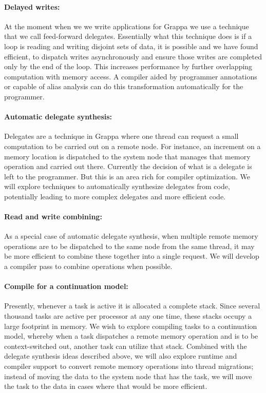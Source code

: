 \paragraph{Delayed writes: } At the moment when we we write applications for Grappa we use a technique that we call feed-forward delegates.  Essentially what this technique does is if a loop is reading and writing disjoint sets of data, it is possible and we have found efficient, to dispatch writes asynchronously and ensure those writes are completed only by the end of the loop.  This increases performance by further overlapping computation with memory access.  A compiler aided by programmer annotations or capable of alias analysis can do this transformation automatically for the programmer.

\paragraph{Automatic delegate synthesis: } Delegates are a technique in Grappa where one thread can request a small computation to be carried out on a remote node.  For instance, an increment on a memory location is dispatched to the system node that manages that memory operation and carried out there.  Currently the decision of what is a delegate is left to the programmer.  But this is an area rich for compiler optimization.  We will explore techniques to automatically synthesize delegates from code, potentially leading to more complex delegates and more efficient code.

\paragraph{Read and write combining: } As a special case of automatic delegate synthesis, when multiple remote memory operations are to be dispatched to the same node from the same thread, it may be more efficient to combine these together into a single request.  We will develop a compiler pass to combine operations when possible.

\paragraph{Compile for a continuation model: } Presently, whenever a task is active it is allocated a complete stack.  Since several thousand tasks are active per processor at any one time, these stacks occupy a large footprint in memory.  We wish to explore compiling tasks to a continuation model, whereby when a task dispatches a remote memory operation and is to be context-switched out, another task can utilize that stack.  Combined with the delegate synthesis ideas described above, we will also explore runtime and compiler support to convert remote memory operations into thread migrations; instead of moving the data to the system node that has the task, we will move the task to the data in cases where that would be more efficient.

